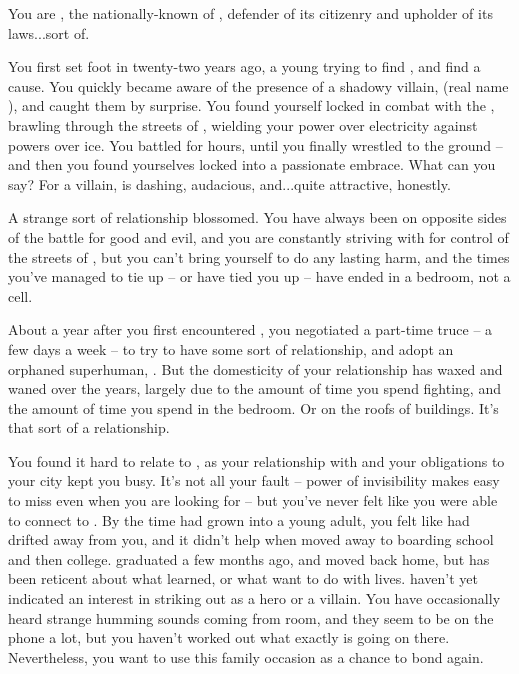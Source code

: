 \documentclass[char]{LRSguildcamp1}
\begin{document}
\name{\cOS{}}
You are \cOS{\intro}, the nationally-known \cOS{\hero} of \pCityO{}, defender of its citizenry and upholder of its laws...sort of.

You first set foot in \pCityO{} twenty-two years ago, a young \cOS{\hero} trying to find \cOS{\themself}, and find a cause.  You quickly became aware of the presence of a shadowy villain, \cOldest{\MYsupername} (real name \cOldest{\intro}), and caught them by surprise.  %
You found yourself locked in combat with the \cOldest{\villain}, brawling through the streets of \pCityO{}, wielding your power over electricity against \cOldest{\their} powers over ice.  You battled for hours, until you finally wrestled \cOldest{\them} to the ground -- and then you found yourselves locked into a passionate embrace.  What can you say?  For a villain, \cOldest{} is dashing, audacious, and...quite attractive, honestly.

A strange sort of relationship blossomed.  You have always been on opposite sides of the battle for good and evil, and you are constantly striving with \cOS{\them} for control of the streets of \pCityO{}, but you can't bring yourself to do \cOS{\them} any lasting harm, and the times you've managed to tie \cOS{\them} up -- or \cOS{\they} have tied you up -- have ended in a bedroom, not a cell.

About a year after you first encountered \cOldest{}, you negotiated a part-time truce -- a few days a week -- to try to have some sort of relationship, and adopt an orphaned superhuman, \cGrad{}.  
But the domesticity of your relationship has waxed and waned over the years, largely due to the amount of time you spend fighting, and the amount of time you spend in the bedroom.  
Or on the roofs of buildings.  
It's that sort of a relationship.

You found it hard to relate to \cGrad{}, as your relationship with \cOldest{} and your obligations to your city kept you busy.
It's not all your fault -- \cGrad{\their} power of invisibility makes \cGrad{\them} easy to miss even when you are looking for \cGrad{\them} -- but you've never felt like you were able to connect to \cGrad{\them}.  
By the time \cGrad{\they} had grown into a young adult, you felt like \cGrad{} had drifted away from you, and it didn't help when \cGrad{\they} moved away to boarding school and then college.
\cGrad{\They} graduated a few months ago, and moved back home, but has been reticent about what \cGrad{\they} learned, or what \cGrad{\they} want to do with \cGrad{\their} lives.  \cGrad{\They} haven't yet indicated an interest in striking out as a hero or a villain.  
You have occasionally heard strange humming sounds coming from \cGrad{\their} room, and they seem to be on the phone a lot, but you haven't worked out what exactly is going on there. %
Nevertheless, you want to use this family occasion as a chance to bond again.
\end{document}
